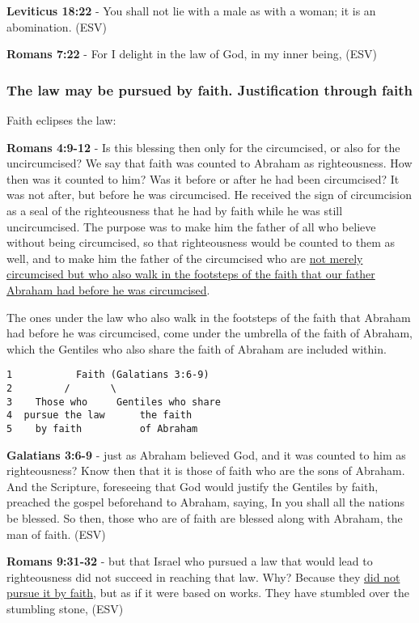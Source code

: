 \documentclass[11pt]{article}
\begin{document}
\textbf{Leviticus 18:22} - You shall not lie with a male as with a woman; it is an abomination. (ESV)

\textbf{Romans 7:22} - For I delight in the law of God, in my inner being, (ESV)

\subsubsection{The law may be pursued by faith. Justification through faith}
\label{sec:org2841500}

Faith eclipses the law:

\textbf{Romans 4:9-12} - Is this blessing then only for the circumcised, or also for the uncircumcised? We say that faith was counted to Abraham as righteousness. How then was it counted to him? Was it before or after he had been circumcised? It was not after, but before he was circumcised. He received the sign of circumcision as a seal of the righteousness that he had by faith while he was still uncircumcised. The purpose was to make him the father of all who believe without being circumcised, so that righteousness would be counted to them as well, and to make him the father of the circumcised who are \uline{not merely circumcised but who also walk in the footsteps of the faith that our father Abraham had before he was circumcised}.

The ones under the law who also walk in the footsteps of the faith that Abraham had before he was circumcised, come under the umbrella of the faith of Abraham, which the Gentiles who also share the faith of Abraham are included within.

\begin{verbatim}
1           Faith (Galatians 3:6-9)
2         /       \
3    Those who     Gentiles who share
4  pursue the law      the faith
5    by faith          of Abraham
\end{verbatim}

\textbf{Galatians 3:6-9} -  just as Abraham believed God, and it was counted to him as righteousness?  Know then that it is those of faith who are the sons of Abraham.  And the Scripture, foreseeing that God would justify the Gentiles by faith, preached the gospel beforehand to Abraham, saying, In you shall all the nations be blessed.  So then, those who are of faith are blessed along with Abraham, the man of faith.  (ESV)

\textbf{Romans 9:31-32} - but that Israel who pursued a law that would lead to righteousness did not succeed in reaching that law. Why? Because they \uline{did not pursue it by faith}, but as if it were based on works. They have stumbled over the stumbling stone, (ESV)
\end{document}
